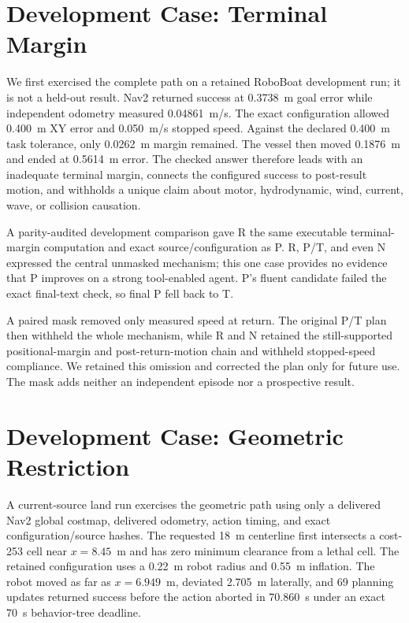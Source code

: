 \documentclass[conference]{IEEEtran}
\begin{document}
\section{Development Case: Terminal Margin}

We first exercised the complete path on a retained RoboBoat development run; it is not a held-out
result. Nav2 returned success at 0.3738~m goal error while independent odometry measured
0.04861~m/s. The exact configuration allowed 0.400~m XY error and 0.050~m/s stopped speed. Against
the declared 0.400~m task tolerance, only 0.0262~m margin remained. The vessel then moved 0.1876~m
and ended at 0.5614~m error. The checked answer therefore leads with an inadequate terminal margin,
connects the configured success to post-result motion, and withholds a unique claim about motor,
hydrodynamic, wind, current, wave, or collision causation.

A parity-audited development comparison gave R the same executable terminal-margin computation
and exact source/configuration as P. R, P/T, and even N expressed the central unmasked mechanism;
this one case provides no evidence that P improves on a strong tool-enabled agent. P's fluent
candidate failed the exact final-text check, so final P fell back to T.

A paired mask removed only measured speed at return. The original P/T plan then withheld the whole
mechanism, while R and N retained the still-supported positional-margin and post-return-motion
chain and withheld stopped-speed compliance. We retained this omission and corrected the plan only
for future use. The mask adds neither an independent episode nor a prospective result.

\section{Development Case: Geometric Restriction}

A current-source land run exercises the geometric path using only a delivered Nav2 global
costmap, delivered odometry, action timing, and exact configuration/source hashes. The requested
18~m centerline first intersects a cost-253 cell near $x=8.45$~m and has zero minimum clearance
from a lethal cell. The retained configuration uses a 0.22~m robot radius and 0.55~m inflation.
The robot moved as far as $x=6.949$~m, deviated 2.705~m laterally, and 69 planning updates returned
success before the action aborted in 70.860~s under an exact 70~s behavior-tree deadline.
\end{document}
